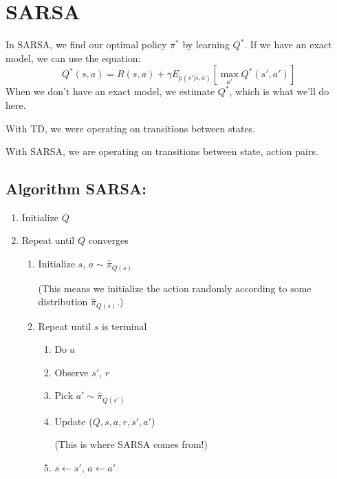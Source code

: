 \documentclass[11pt]{article}
\numberwithin{equation}{section}
\numberwithin{figure}{section}
\begin{document}
\section{SARSA}
In SARSA, we find our optimal policy $\pi^*$ by learning $Q^*$.  If we have an exact model, we can use the equation:
\begin{equation}
	Q^*(s,a) = R(s,a) + \gamma E_{p(s'|s,a)}[\max_{a'} Q^*(s',a')]
	\label{eq.sarsa}
\end{equation}
When we don't have an exact model, we estimate $Q^*$, which is what we'll do here.

With TD, we were operating on transitions between states.

With SARSA, we are operating on transitions between state, action pairs.
\subsection*{Algorithm SARSA:}
\begin{enumerate}
	\item Initialize $Q$
	\item Repeat until $Q$ converges
	\begin{enumerate}
		\item Initialize $s$, $a \sim \hat{\pi}_{Q(s)}$

		(This means we initialize the action randomly according to some distribution $\hat{\pi}_{Q(s)}$.)
		\item Repeat until $s$ is terminal
		\begin{enumerate}
			\item Do $a$
			\item Observe $s'$, $r$
			\item Pick $a' \sim \hat{\pi}_{Q(s')}$
			\item Update ($Q, s, a, r, s', a'$)
			
			(This is where SARSA comes from!)
			\item $s \leftarrow s'$, $a \leftarrow a'$ 
		\end{enumerate}
	\end{enumerate}
\end{enumerate}

\end{document}
